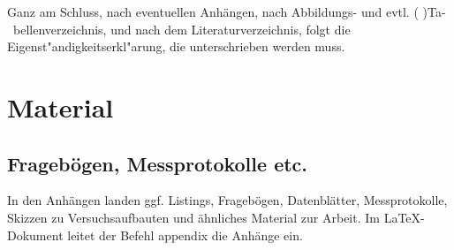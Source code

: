 Ganz am Schluss, nach eventuellen Anhängen, nach Abbildungs- und evtl. ( \- )Ta-\ bellenverzeichnis, und nach dem Literaturverzeichnis, folgt die Eigenst{"a}ndigkeitserkl{"a}rung, die unterschrieben werden muss.


\appendix
\chapter{Material}

\section{Fragebögen, Messprotokolle etc.}
In den Anhängen landen ggf. Listings, Fragebögen, Datenblätter, Messprotokolle, Skizzen zu Versuchsaufbauten und ähnliches Material zur Arbeit. Im \LaTeX-Dokument leitet der Befehl appendix die Anhänge ein.




\listoffigures %
\listoftables %


